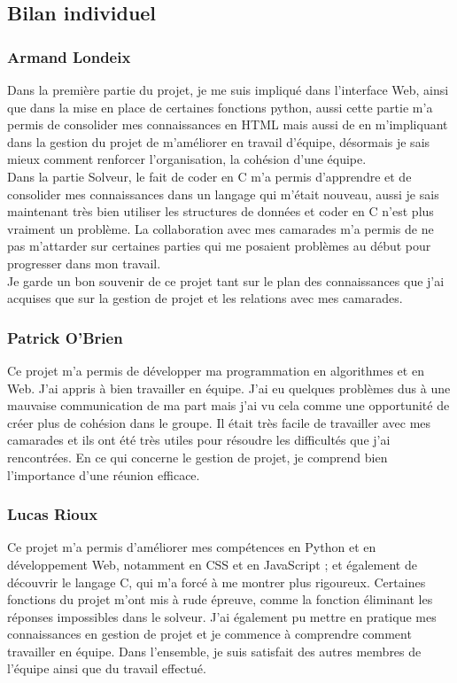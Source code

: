 \subsection{Bilan individuel}

\subsubsection{Armand Londeix} 
Dans la première partie du projet, je me suis impliqué dans l'interface Web, ainsi que dans la mise en place de certaines fonctions python, aussi cette partie m'a permis de consolider mes connaissances en HTML mais aussi de en m'impliquant dans la gestion du projet de m'améliorer en travail d'équipe, désormais je sais mieux comment renforcer l'organisation, la cohésion d'une équipe. \\
Dans la partie Solveur, le fait de coder en C m'a permis d'apprendre et de consolider mes connaissances dans un langage qui m'était nouveau, aussi je sais maintenant très bien utiliser les structures de données et coder en C n'est plus vraiment un problème. La collaboration avec mes camarades m'a permis de ne pas m'attarder sur certaines parties qui me posaient problèmes au début pour progresser dans mon travail. \\ 
Je garde un bon souvenir de ce projet tant sur le plan des connaissances que j'ai acquises que sur la gestion de projet et les relations avec mes camarades. \\ 
\subsubsection{Patrick O'Brien}
Ce projet m'a permis de développer ma programmation en algorithmes et en Web. J'ai appris à bien travailler en équipe. J'ai eu quelques problèmes dus à une mauvaise communication de ma part mais j'ai vu cela comme une opportunité de créer plus de cohésion dans le groupe. Il était très facile de travailler avec mes camarades et ils ont été très utiles pour résoudre les difficultés que j'ai rencontrées. En ce qui concerne le gestion de projet, je comprend bien l'importance d'une réunion efficace.
\\ 
 
\subsubsection{Lucas Rioux}

Ce projet m'a permis d'améliorer mes compétences en Python et en développement Web, notamment en CSS et en JavaScript ; et également de découvrir le langage C, qui m'a forcé à me montrer plus rigoureux. Certaines fonctions du projet m'ont mis à rude épreuve, comme la fonction éliminant les réponses impossibles dans le solveur.
J'ai également pu mettre en pratique mes connaissances en gestion de projet et je commence à comprendre comment travailler en équipe. Dans l'ensemble, je suis satisfait des autres membres de l'équipe ainsi que du travail effectué.

